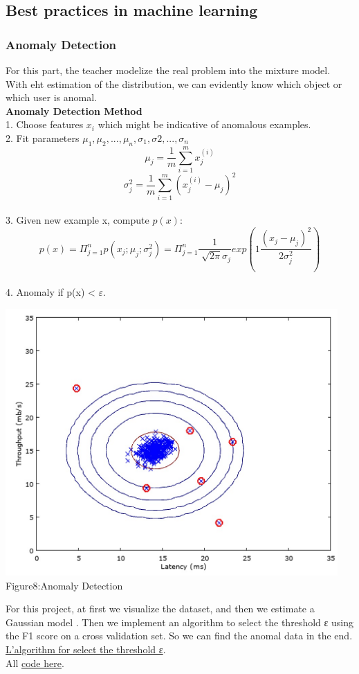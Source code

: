 \documentclass[a4paper]{article}
\begin{document}
{\subsection{Best practices in machine learning}
\subsubsection{\textbf{Anomaly Detection}}
For this part, the teacher modelize the real problem into the mixture model. With eht estimation of the distribution, we can evidently know which object or which user is anomal.\\
\textbf{Anomaly Detection Method}\\
1. Choose features $x_i$ which might be indicative of anomalous examples.\\
2. Fit parameters $\mu_1,\mu_2,...,\mu_n,\sigma_1,\sigma2,...,\sigma_n$\\
$$\mu_j=\frac{1}{m}\sum_{i=1}^{m}x_j^{(i)}$$
$$\sigma_j^2=\frac{1}{m}\sum_{i=1}^{m}(x_j^{(i)}-\mu_j)^2$$\\
3. Given new example x, compute $p(x)$:
$$p(x)=\Pi_{j=1}^np(x_j;\mu_j;\sigma_j^2)=\Pi_{j=1}^n\frac{1}{\sqrt[]{2\pi}\sigma_j}exp(1\frac{(x_j-\mu_j)^2}{2\sigma_j^2})$$\\
4. Anomaly if p(x) < $\varepsilon$.
 \begin{center}
 \includegraphics[width=5in]{dt.png}
Figure8:Anomaly Detection
\end{center}
For this project, at first we visualize the dataset, and then we estimate a Gaussian model . Then we implement an algorithm to select the threshold ε using the F1 score on a cross validation set. So we can find the anomal data in the end.
\href{https://github.com/GuangYueCHEN/ENSIIE/blob/master/Plus/MachineLearning/machine-learning-ex8/ex8/selectThreshold.m}{L'algorithm for select the threshold ε}.\\
All \href{https://github.com/GuangYueCHEN/ENSIIE/tree/master/Plus/MachineLearning/machine-learning-ex8}{code here}.
}
\end{document}
